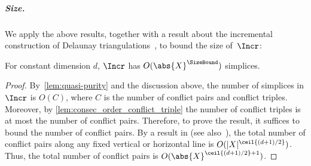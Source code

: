 %
\subparagraph{Size.}
We apply the above results, together with a result about the incremental construction of Delaunay triangulations~\cite{edelsbrunnerIncrementalTopologicalFlipping1996}, to bound the size of~$\Incr$:
%
\begin{theorem}\label{thm:incr-size}
 For constant dimension $d$, $\Incr$ has $O(\abs{X}^{\SizeBound})$ simplices.
\end{theorem}
%
\begin{proof}
By~\cref{lem:quasi-purity} and the discussion above, the number of simplices in $\Incr$ is $O(C)$, where $C$
is the number of conflict pairs and conflict triples.  Moreover, by \cref{lem:consec_order_conflict_triple} the number of conflict triples is at most the number of conflict pairs.  Therefore, to prove the result, it suffices to bound the number of conflict pairs.  
By a result in \cite[Section 9]{edelsbrunnerIncrementalTopologicalFlipping1996} (see also~\cite[Theorem 2.6]{alonsoDelaunayBifiltrationsFunctions2024}), the total number of conflict pairs along any fixed vertical or horizontal line is $O(|X|^{\ceil{(d+1)/2}})$.  Thus, the total number of conflict pairs is $O(\abs{X}^{\ceil{(d+1)/2} + 1})$.
\end{proof}
%
%
%
%
